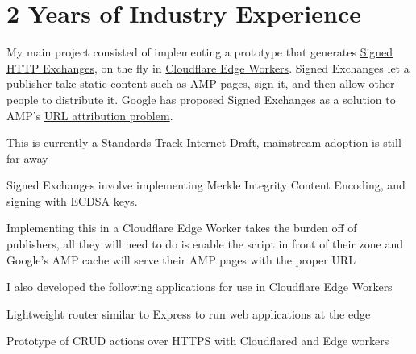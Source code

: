\documentclass[letterpaper]{deedy-resume} %
\begin{document}
\begin{minipage}[t]{0.64\textwidth} %


\section{2 Years of Industry Experience}


\sectionspace
My main project consisted of implementing a prototype that generates \href{https://tools.ietf.org/html/draft-yasskin-http-origin-signed-responses-04}{Signed HTTP Exchanges}, on the fly in \href{https://developers.cloudflare.com/workers/}{Cloudflare Edge Workers}. Signed Exchanges let a publisher take static content such as AMP pages, sign it, and then allow other people to distribute it. Google has proposed Signed Exchanges as a solution to AMP's \href{https://80x24.net/post/the-problem-with-amp/}{URL attribution problem}. 
\sectionspace
\begin {tightitemize}
\item This is currently a Standards Track Internet Draft, mainstream adoption is still far away
\item Signed Exchanges involve implementing Merkle Integrity Content Encoding, and signing with ECDSA keys.
\item Implementing this in a Cloudflare Edge Worker takes the burden off of publishers, all they will need to do is enable the script in front of their zone and Google's AMP cache will serve their AMP pages with the proper URL
\end {tightitemize}
I also developed the following applications for use in Cloudflare Edge Workers
\begin {tightitemize}
\item Lightweight router similar to Express to run web applications at the edge
\item Prototype of CRUD actions over HTTPS with Cloudflared and Edge workers
\end {tightitemize}
\sectionspace
{}


\end{minipage}
\end{document}
